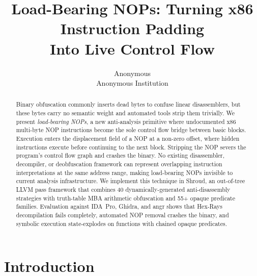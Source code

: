 \documentclass[letterpaper,twocolumn,10pt]{article}
\begin{document}

\date{}

\title{\Large \bf Load-Bearing NOPs: Turning x86 Instruction Padding\\Into Live Control Flow}

\author{
{\rm Anonymous}\\
Anonymous Institution
}

\maketitle

\begin{abstract}

Binary obfuscation commonly inserts dead bytes to confuse linear disassemblers, but these bytes carry no semantic weight and automated tools strip them trivially. We present \emph{load-bearing NOPs}, a new anti-analysis primitive where undocumented x86 multi-byte NOP instructions become the sole control flow bridge between basic blocks. Execution enters the displacement field of a NOP at a non-zero offset, where hidden instructions execute before continuing to the next block. Stripping the NOP severs the program's control flow graph and crashes the binary. No existing disassembler, decompiler, or deobfuscation framework can represent overlapping instruction interpretations at the same address range, making load-bearing NOPs invisible to current analysis infrastructure. We implement this technique in Shroud, an out-of-tree LLVM pass framework that combines 40 dynamically-generated anti-disassembly strategies with truth-table MBA arithmetic obfuscation and 55+ opaque predicate families. Evaluation against IDA~Pro, Ghidra, and angr shows that Hex-Rays decompilation fails completely, automated NOP removal crashes the binary, and symbolic execution state-explodes on functions with chained opaque predicates.

\end{abstract}

\section{Introduction}
\label{sec:intro}
\end{document}
